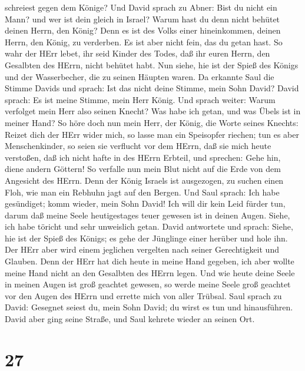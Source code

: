 schreiest gegen dem Könige?  Und David sprach zu Abner:
Bist du nicht ein Mann? und wer ist dein gleich in Israel? Warum hast du
denn nicht behütet deinen Herrn, den König? Denn es ist des Volks einer
hineinkommen, deinen Herrn, den König, zu verderben.  Es
ist aber nicht fein, das du getan hast. So wahr der HErr lebet, ihr seid
Kinder des Todes, daß ihr euren Herrn, den Gesalbten des HErrn, nicht
behütet habt. Nun siehe, hie ist der Spieß des Königs und der
Wasserbecher, die zu seinen Häupten waren.  Da erkannte
Saul die Stimme Davids und sprach: Ist das nicht deine Stimme, mein Sohn
David? David sprach: Es ist meine Stimme, mein Herr König. 
Und sprach weiter: Warum verfolget mein Herr also seinen Knecht? Was
habe ich getan, und was Übels ist in meiner Hand?  So höre
doch nun mein Herr, der König, die Worte seines Knechts: Reizet dich der
HErr wider mich, so lasse man ein Speisopfer riechen; tun es aber
Menschenkinder, so seien sie verflucht vor dem HErrn, daß sie mich heute
verstoßen, daß ich nicht hafte in des HErrn Erbteil, und sprechen: Gehe
hin, diene andern Göttern!  So verfalle nun mein Blut nicht
auf die Erde von dem Angesicht des HErrn. Denn der König Israels ist
ausgezogen, zu suchen einen Floh, wie man ein Rebhuhn jagt auf den
Bergen.  Und Saul sprach: Ich habe gesündiget; komm wieder,
mein Sohn David! Ich will dir kein Leid fürder tun, darum daß meine
Seele heutigestages teuer gewesen ist in deinen Augen. Siehe, ich habe
töricht und sehr unweislich getan.  David antwortete und
sprach: Siehe, hie ist der Spieß des Königs; es gehe der Jünglinge einer
herüber und hole ihn.  Der HErr aber wird einem jeglichen
vergelten nach seiner Gerechtigkeit und Glauben. Denn der HErr hat dich
heute in meine Hand gegeben, ich aber wollte meine Hand nicht an den
Gesalbten des HErrn legen.  Und wie heute deine Seele in
meinen Augen ist groß geachtet gewesen, so werde meine Seele groß
geachtet vor den Augen des HErrn und errette mich von aller Trübsal.
 Saul sprach zu David: Gesegnet seiest du, mein Sohn David;
du wirst es tun und hinausführen. David aber ging seine Straße, und Saul
kehrete wieder an seinen Ort.

\hypertarget{section-26}{%
\section{27}\label{section-26}}

